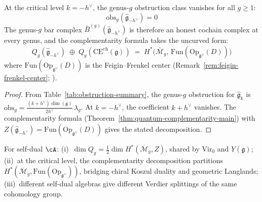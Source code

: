 \begin{corollary}
\label{cor:critical-uncurving}
At the critical level $k = -h^\vee$, the genus-$g$ obstruction class
vanishes for all $g \geq 1$:
\begin{equation}\label{eq:critical-uncurving}
\mathrm{obs}_g(\widehat{\mathfrak{g}}_{-h^\vee}) = 0
\end{equation}
The genus-$g$ bar complex $\bar{B}^{(g)}(\widehat{\mathfrak{g}}_{-h^\vee})$
is therefore an honest cochain complex at every genus, and the
complementarity formula takes the uncurved form:
\begin{equation}\label{eq:critical-complementarity}
Q_g(\widehat{\mathfrak{g}}_{-h^\vee})
\;\oplus\;
Q_g(\mathrm{CE}^{\mathrm{ch}}(\mathfrak{g}))
\;=\;
H^*\!\bigl(\overline{\mathcal{M}}_g,\,
\mathrm{Fun}(\mathrm{Op}_{\mathfrak{g}^\vee}(D))\bigr)
\end{equation}
where $\mathrm{Fun}(\mathrm{Op}_{\mathfrak{g}^\vee}(D))$ is the
Feigin--Frenkel center (Remark~\ref{rem:feigin-frenkel-center}; \cite{Feigin-Frenkel}).
\end{corollary}

\begin{proof}
From Table~\ref{tab:obstruction-summary}, the genus-$g$ obstruction for
$\widehat{\mathfrak{g}}_k$ is
$\mathrm{obs}_g = \frac{(k+h^\vee)\dim(\mathfrak{g})}{2h^\vee}\,
\lambda_g$.
At $k = -h^\vee$, the coefficient $k + h^\vee$ vanishes.  The
complementarity formula
(Theorem~\ref{thm:quantum-complementarity-main}) with
$Z(\widehat{\mathfrak{g}}_{-h^\vee})
= \mathrm{Fun}(\mathrm{Op}_{\mathfrak{g}^\vee}(D))$ gives the stated
decomposition.
\end{proof}

\begin{remark}[Significance]\label{rem:self-dual-significance}
For self-dual $\cA$: (i)~$\dim Q_g=\tfrac{1}{2}\dim H^*(\overline{\mathcal{M}}_g,Z)$,
shared by $\mathrm{Vir}_0$ and $Y(\mathfrak{g})$;
(ii)~at the critical level, the complementarity decomposition
partitions $H^*(\overline{\mathcal{M}}_g,
\mathrm{Fun}(\mathrm{Op}_{\mathfrak{g}^\vee}))$, bridging chiral
Koszul duality and geometric Langlands;
(iii)~different self-dual algebras give different Verdier splittings
of the same cohomology group.
\end{remark}

